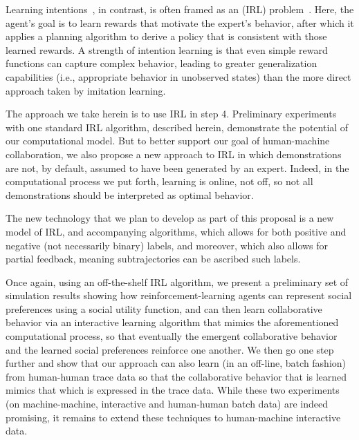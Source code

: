 Learning intentions~\cite{macglashan15b}, in contrast, is often framed
as an  (IRL)
problem~\cite{ng00,babes11}.  Here, the agent's goal is to learn
rewards that motivate the expert's behavior, after which it applies a
planning algorithm to derive a policy that is consistent with those
learned rewards.  A strength of intention learning is that even simple
reward functions can capture complex behavior, leading to greater
generalization capabilities (i.e., appropriate behavior in unobserved
states) than the more direct approach taken by imitation learning.

The approach we take herein is to use IRL in step 4.  Preliminary
experiments with one standard IRL algorithm, described herein,
demonstrate the potential of our computational model.
%
But to better support our goal of human-machine collaboration, we also
propose a new approach to IRL in which demonstrations are not, by
default, assumed to have been generated by an expert.  Indeed, in the
computational process we put forth, learning is online, not off, so
not all demonstrations should be interpreted as optimal behavior.

The new technology that we plan to develop as part of this proposal is
a new model of IRL, and accompanying algorithms, which allows for both
positive and negative (not necessarily binary) labels, and moreover,
which also allows for partial feedback, meaning subtrajectories can be
ascribed such labels.

Once again, using an off-the-shelf IRL algorithm, we present a
preliminary set of simulation results showing how
reinforcement-learning agents
can represent social preferences using a social utility function, and
can then learn collaborative behavior via an interactive learning
algorithm that mimics the aforementioned computational process, so
that eventually the emergent collaborative behavior and the learned
social preferences reinforce one another.  We then go one step further
and show that our approach can also learn (in an off-line, batch
fashion) from human-human trace data so that the collaborative
behavior that is learned mimics that which is expressed in the trace
data.  While these two experiments (on machine-machine, interactive
and human-human batch data) are indeed promising, it remains to extend
these techniques to human-machine interactive data.

